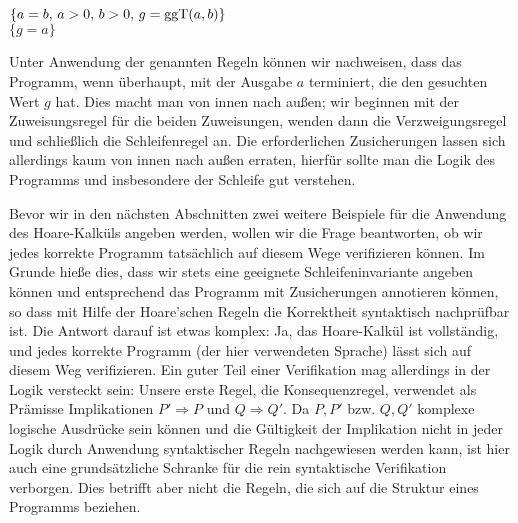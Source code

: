 \begin{algorithm}
	\vspace{2mm} %
	\vspace{\baselineskip}
	
	\HiLi $\{a = b, \, a > 0, \, b > 0, \, g= {\text{ggT}}(a,b)\}$ \\
	\HiLi $\{g = a\}$
	
	\vspace{2mm} %
	\vspace{\baselineskip}
	

	\vspace{2mm} %
	\vspace{\baselineskip}
\end{algorithm}

\clearpage %

Unter Anwendung der genannten Regeln können wir nachweisen, dass das Programm, wenn überhaupt, mit der Ausgabe $a$ terminiert, die den gesuchten Wert $g$ hat. Dies macht man von innen nach außen; wir beginnen mit der Zuweisungs\-regel für die beiden Zuweisungen, wenden dann die Verzweigungsregel und schließlich die Schleifenregel an. Die erforderlichen Zusicherungen lassen sich allerdings kaum von innen nach außen erraten, hierfür sollte man die Logik des Programms und ins\-besondere der Schleife gut verstehen.

\vspace{2mm} %

Bevor wir in den nächsten Abschnitten zwei weitere Beispiele für die Anwendung des Hoare-Kalküls angeben werden, wollen wir die Frage beantworten, ob wir jedes korrekte Programm tatsächlich auf diesem Wege verifizieren können. Im Grunde hieße dies, dass wir stets eine geeignete Schleifeninvariante angeben können und entsprechend das Programm mit Zusicherungen annotieren können, so dass mit Hilfe der Hoare'schen Regeln die Korrektheit syntaktisch nachprüfbar ist. Die Antwort darauf ist etwas komplex: Ja, das Hoare-Kalkül ist vollständig, und jedes korrekte Programm (der hier verwendeten Sprache) lässt sich auf diesem Weg verifizieren. Ein guter Teil einer Verifikation mag allerdings in der Logik versteckt sein: Unsere erste Regel, die Konsequenzregel, verwendet als Prämisse Implikationen $P' \Rightarrow P$ und $Q \Rightarrow Q'$. Da $P, P'$ bzw. $Q, Q'$ komplexe logische Ausdrücke sein können und die Gültigkeit der Implikation nicht in jeder Logik durch Anwendung syntaktischer Regeln nachgewiesen werden kann, ist hier auch eine grundsätzliche Schranke für die rein syntaktische Verifikation verborgen. Dies betrifft aber nicht die Regeln, die sich auf die Struktur eines Programms beziehen.